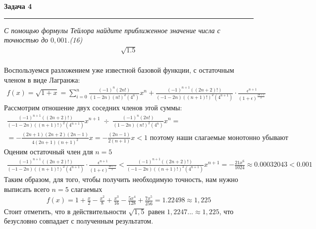 \documentclass[a4paper,11pt]{article}
\begin{document}







\textbf{\large Задача 4}
\medskip\hrule\medskip
\textsl{С помощью формулы Тейлора  найдите приближенное значение числа с точностью до $ 0, 001 $.(16)} 
\begin{align*}
	\sqrt{1.5}
\end{align*} \\

Воспользуемся разложением уже известной базовой функции, с остаточным членом в виде Лагранжа:  
\begin{gather*}
	f(x) = \sqrt{1 + x} =
	\sum_{i = 0}^{n} \frac{(-1)^n (2n!)}{(1 - 2n)(n!)^2(4^n)}x^n + \frac{(-1)^{n + 1} ((2n + 2)!)}{(-1 - 2n)((n + 1)!)^2(4^{n + 1})} \cdot \frac{\epsilon^{n + 1}}{(1 + \epsilon)^{\frac{2n + 1}2}}
\end{gather*}
Рассмотрим отношение двух соседних членов этой суммы:
\begin{gather*}
\frac{(-1)^{n + 1} ((2n + 2)!)}{(-1 - 2n)((n + 1)!)^2(4^{n + 1})}x^{n + 1} \; \div \; \frac{(-1)^n (2n!)}{(1 - 2n)(n!)^2(4^n)}x^n =\\[2pt]
= - \frac{(2n + 1)(2n + 2)(2n - 1)}{4(2n + 1)(n + 1)^2}x
= - \frac{(2n - 1)}{2(n + 1)}x < 1 \text{ поэтому наши слагаемые монотонно убывают}
\end{gather*}
Оценим остаточный член для $ n = 5 $
\begin{gather*}
\frac{(-1)^{n + 1} ((2n + 2)!)}{(-1 - 2n)((n + 1)!)^2(4^{n + 1})}\cdot \frac{\epsilon^{n + 1}}{(1 + \epsilon)^{\frac{2n + 1}2}} < 
\frac{(-1)^{n + 1} ((2n + 2)!)}{(-1 - 2n)((n + 1)!)^2(4^{n + 1})}x^{n + 1} = -\frac{21x^6}{1024} \approx 0.00032043 < 0.001
\end{gather*}
Таким образом, для того, чтобы получить необходимую точность, нам нужно выписать всего $ n = 5 $ слагаемых
\begin{gather*}
	f(x) = 1 + \frac{x}{2} - \frac{x^2}{8} + \frac{x^3}{16} - \frac{5x^4}{128} + \frac{7x^5}{256}
	= 1.22498 \approx 1,225
\end{gather*}
Стоит отметить, что в действительности $ \sqrt{1,5} $ равен $ 1,2247... \approx 1, 225$, что безусловно совпадает с полученным результатом. 
\\ \\



\end{document}
